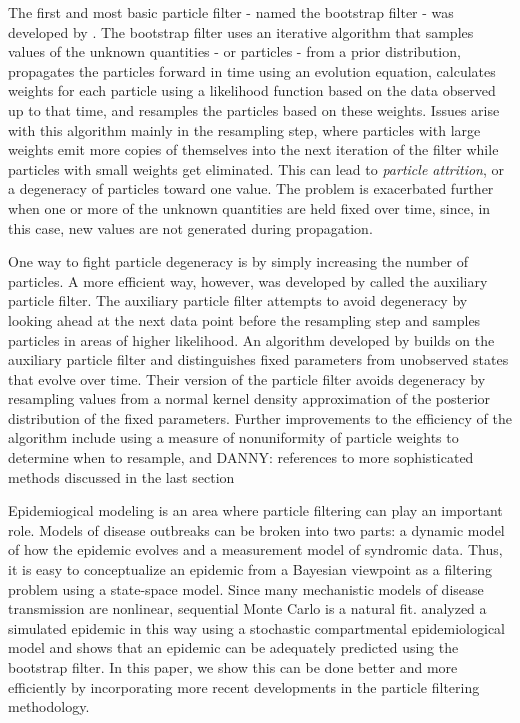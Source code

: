 \documentclass{elsarticle}
\newcommand{\danny}[1]{{\color{blue}DANNY: #1}}
\begin{document}
The first and most basic particle filter - named the bootstrap filter - was developed by \citet{Gord:Salm:Smit:nove:1993}.  The bootstrap filter uses an iterative algorithm that samples values of the unknown quantities - or particles - from a prior distribution, propagates the particles forward in time using an evolution equation, calculates weights for each particle using a likelihood function based on the data observed up to that time, and resamples the particles based on these weights.  Issues arise with this algorithm mainly in the resampling step, where particles with large weights emit more copies of themselves into the next iteration of the filter while particles with small weights get eliminated.  This can lead to \emph{particle attrition}, or a degeneracy of particles toward one value.  The problem is exacerbated further when one or more of the unknown quantities are held fixed over time, since, in this case, new values are not generated during propagation.

One way to fight particle degeneracy is by simply increasing the number of particles.  A more efficient way, however, was developed by \citet{Pitt:Shep:filt:1999} called the auxiliary particle filter.  The auxiliary particle filter attempts to avoid degeneracy by looking ahead at the next data point before the resampling step and samples particles in areas of higher likelihood.  An algorithm developed by \citet{Liu:West:comb:2001} builds on the auxiliary particle filter and distinguishes fixed parameters from unobserved states that evolve over time.  Their version of the particle filter avoids degeneracy by resampling values from a normal kernel density approximation of the posterior distribution of the fixed parameters.  Further improvements to the efficiency of the algorithm include using a measure of nonuniformity of particle weights to determine when to resample, and \danny{references to more sophisticated methods discussed in the last section}

Epidemiogical modeling is an area where particle filtering can play an important role.  Models of disease outbreaks can be broken into two parts: a dynamic model of how the epidemic evolves and a measurement model of syndromic data.  Thus, it is easy to conceptualize an epidemic from a Bayesian viewpoint as a filtering problem using a state-space model.  Since many mechanistic models of disease transmission are nonlinear, sequential Monte Carlo is a natural fit.  \citet{skvortsov2012monitoring} analyzed a simulated epidemic in this way using a stochastic compartmental epidemiological model and shows that an epidemic can be adequately predicted using the bootstrap filter.  In this paper, we show this can be done better and more efficiently by incorporating more recent developments in the particle filtering methodology.
\end{document}
